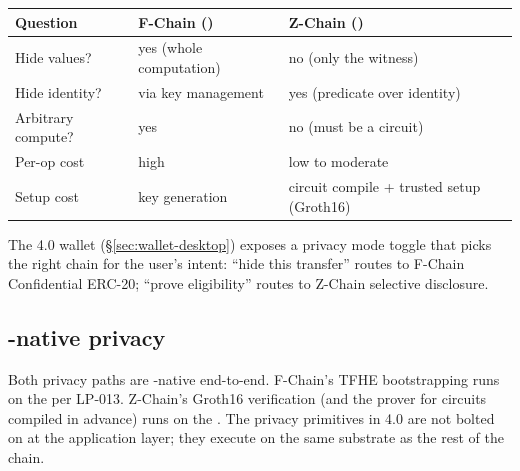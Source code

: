 \begin{longtable}{p{}p{}p{}}
\toprule
\textbf{Question} & \textbf{F-Chain (\FHE{})} & \textbf{Z-Chain (\ZKP{})} \\
\midrule
Hide values? & yes (whole computation) & no (only the witness) \\
Hide identity? & via key management & yes (predicate over identity) \\
Arbitrary compute? & yes & no (must be a circuit) \\
Per-op cost & high & low to moderate \\
Setup cost & key generation & circuit compile + trusted setup (Groth16) \\
\bottomrule
\end{longtable}

The \Zoo{} 4.0 wallet (\S\ref{sec:wallet-desktop}) exposes a privacy
mode toggle that picks the right chain for the user's intent: ``hide
this transfer'' routes to F-Chain Confidential ERC-20; ``prove
eligibility'' routes to Z-Chain selective disclosure.

\subsection{\GPU{}-native privacy}

Both privacy paths are \GPU{}-native end-to-end. F-Chain's TFHE
bootstrapping runs on the \GPU{} per LP-013. Z-Chain's Groth16
verification (and the prover for circuits compiled in advance) runs
on the \GPU{}. The privacy primitives in \Zoo{} 4.0 are not bolted on
at the application layer; they execute on the same substrate as the
rest of the chain.

